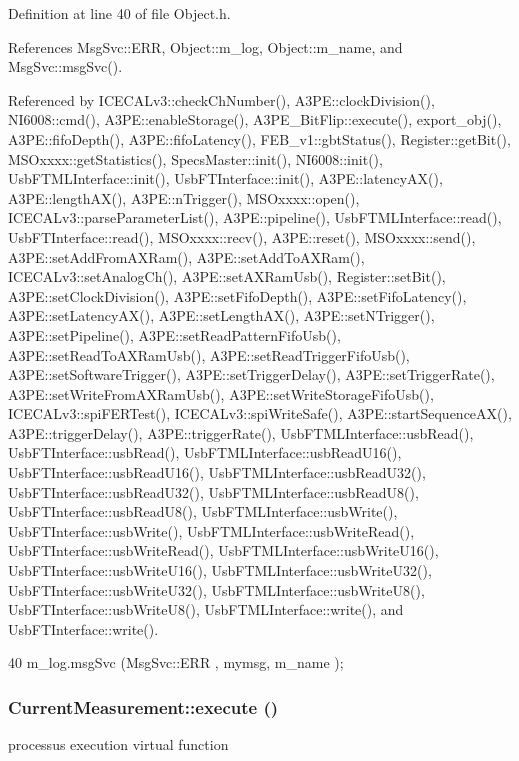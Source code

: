 Definition at line 40 of file Object.h.

References MsgSvc::ERR, Object::m\_\-log, Object::m\_\-name, and MsgSvc::msgSvc().

Referenced by ICECALv3::checkChNumber(), A3PE::clockDivision(), NI6008::cmd(), A3PE::enableStorage(), A3PE\_\-BitFlip::execute(), export\_\-obj(), A3PE::fifoDepth(), A3PE::fifoLatency(), FEB\_\-v1::gbtStatus(), Register::getBit(), MSOxxxx::getStatistics(), SpecsMaster::init(), NI6008::init(), UsbFTMLInterface::init(), UsbFTInterface::init(), A3PE::latencyAX(), A3PE::lengthAX(), A3PE::nTrigger(), MSOxxxx::open(), ICECALv3::parseParameterList(), A3PE::pipeline(), UsbFTMLInterface::read(), UsbFTInterface::read(), MSOxxxx::recv(), A3PE::reset(), MSOxxxx::send(), A3PE::setAddFromAXRam(), A3PE::setAddToAXRam(), ICECALv3::setAnalogCh(), A3PE::setAXRamUsb(), Register::setBit(), A3PE::setClockDivision(), A3PE::setFifoDepth(), A3PE::setFifoLatency(), A3PE::setLatencyAX(), A3PE::setLengthAX(), A3PE::setNTrigger(), A3PE::setPipeline(), A3PE::setReadPatternFifoUsb(), A3PE::setReadToAXRamUsb(), A3PE::setReadTriggerFifoUsb(), A3PE::setSoftwareTrigger(), A3PE::setTriggerDelay(), A3PE::setTriggerRate(), A3PE::setWriteFromAXRamUsb(), A3PE::setWriteStorageFifoUsb(), ICECALv3::spiFERTest(), ICECALv3::spiWriteSafe(), A3PE::startSequenceAX(), A3PE::triggerDelay(), A3PE::triggerRate(), UsbFTMLInterface::usbRead(), UsbFTInterface::usbRead(), UsbFTMLInterface::usbReadU16(), UsbFTInterface::usbReadU16(), UsbFTMLInterface::usbReadU32(), UsbFTInterface::usbReadU32(), UsbFTMLInterface::usbReadU8(), UsbFTInterface::usbReadU8(), UsbFTMLInterface::usbWrite(), UsbFTInterface::usbWrite(), UsbFTMLInterface::usbWriteRead(), UsbFTInterface::usbWriteRead(), UsbFTMLInterface::usbWriteU16(), UsbFTInterface::usbWriteU16(), UsbFTMLInterface::usbWriteU32(), UsbFTInterface::usbWriteU32(), UsbFTMLInterface::usbWriteU8(), UsbFTInterface::usbWriteU8(), UsbFTMLInterface::write(), and UsbFTInterface::write().


\begin{DoxyCode}
40 { m_log.msgSvc (MsgSvc::ERR     , mymsg, m_name ); }
\end{DoxyCode}
\hypertarget{classCurrentMeasurement_a19ae0dcc63b4151ceebe0bf2c42da948}{
\subsubsection[{execute}]{ CurrentMeasurement::execute ()}}
\label{classCurrentMeasurement_a19ae0dcc63b4151ceebe0bf2c42da948}
processus execution virtual function 

